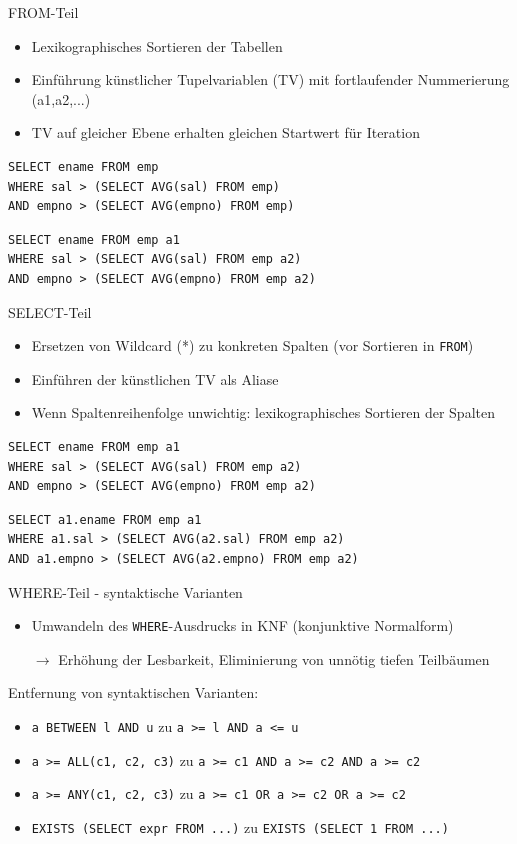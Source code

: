 \documentclass{beamer}
\begin{document}

\begin{frame}[fragile]{FROM-Teil}
\begin{itemize}
\item Lexikographisches Sortieren der Tabellen
\item Einführung künstlicher Tupelvariablen (TV) mit fortlaufender Nummerierung (a1,a2,...)
\item TV auf gleicher Ebene erhalten gleichen Startwert für Iteration
\end{itemize}
\pause
\begin{verbatim}
SELECT ename FROM emp
WHERE sal > (SELECT AVG(sal) FROM emp)
AND empno > (SELECT AVG(empno) FROM emp)
\end{verbatim}
\pause
\begin{verbatim}
SELECT ename FROM emp a1
WHERE sal > (SELECT AVG(sal) FROM emp a2)
AND empno > (SELECT AVG(empno) FROM emp a2)
\end{verbatim}
\end{frame}

\begin{frame}[fragile]{SELECT-Teil}
\begin{itemize}
\item Ersetzen von Wildcard (*) zu konkreten Spalten (vor Sortieren in \verb|FROM|)
\item Einführen der künstlichen TV als Aliase
\item Wenn Spaltenreihenfolge unwichtig: lexikographisches Sortieren der Spalten
\end{itemize}
\pause
\begin{verbatim}
SELECT ename FROM emp a1
WHERE sal > (SELECT AVG(sal) FROM emp a2)
AND empno > (SELECT AVG(empno) FROM emp a2)
\end{verbatim}
\pause
\begin{verbatim}
SELECT a1.ename FROM emp a1
WHERE a1.sal > (SELECT AVG(a2.sal) FROM emp a2)
AND a1.empno > (SELECT AVG(a2.empno) FROM emp a2)
\end{verbatim}
\end{frame}


\begin{frame}[fragile]{WHERE-Teil - syntaktische Varianten}
\begin{itemize}
\item Umwandeln des \verb|WHERE|-Ausdrucks in KNF (konjunktive Normalform) 
\item[$\to$] Erhöhung der Lesbarkeit, Eliminierung von unnötig tiefen Teilbäumen
\end{itemize}
Entfernung von syntaktischen Varianten:\pause
\begin{itemize}
\item \verb|a BETWEEN l AND u| zu \verb|a >= l AND a <= u|
\item \verb|a >= ALL(c1, c2, c3)| zu \verb|a >= c1 AND a >= c2 AND a >= c2|
\item \verb|a >= ANY(c1, c2, c3)| zu \verb|a >= c1 OR a >= c2 OR a >= c2|
\item \verb|EXISTS (SELECT expr FROM ...)| zu \verb|EXISTS (SELECT 1 FROM ...)|
\end{itemize}
\end{frame}
\end{document}
